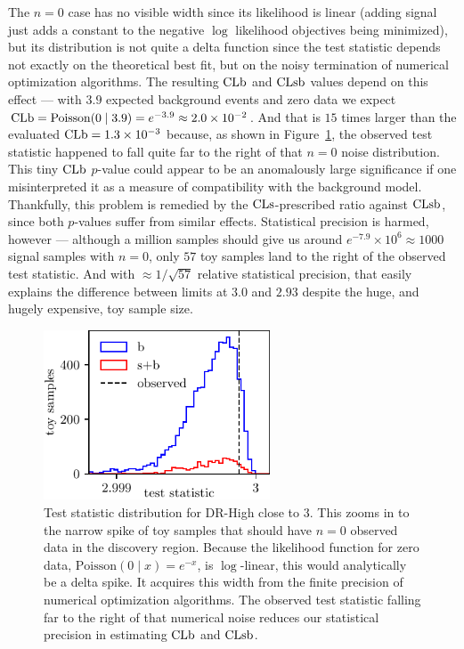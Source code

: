 The $n=0$ case has no visible width since its likelihood is linear
(adding signal just adds a constant to the negative $\log$ likelihood
objectives being minimized), but its distribution is not quite a delta function since the test
statistic depends not exactly on the theoretical best fit, but on the noisy
termination of numerical optimization algorithms.
The resulting $\mathrm{CLb}$ and $\mathrm{CLsb}$ values depend on this effect ---
with $3.9$ expected background events and zero data we expect
$\mathrm{CLb} = \mathrm{Poisson}(0\mid 3.9) = e^{-3.9} \approx 2.0\times 10^{-2}$.
And that is $15$ times larger than the evaluated $\mathrm{CLb} = 1.3\times 10^{-3}$
because, as shown in Figure~\ref{fig:2ljets_test_stat_distributions_drhigh_n0},
the observed test statistic happened to fall quite far to the right
of that $n=0$ noise distribution.
This tiny $\mathrm{CLb}$ $p$-value could appear to be an anomalously large
significance if one misinterpreted it as a measure of compatibility with the
background model.
Thankfully, this problem is remedied by the $\mathrm{CLs}$-prescribed ratio
against $\mathrm{CLsb}$, since both $p$-values suffer from similar effects.
Statistical precision is harmed, however --- although a million samples should
give us around $e^{-7.9} \times 10^6 \approx 1000$ signal samples with
$n=0$, only $57$ toy samples land to the right of the observed test statistic.
And with $\approx1/\sqrt{57}$ relative statistical precision, that easily
explains the difference between limits at $3.0$ and $2.93$ despite the huge,
and hugely expensive, toy sample size.

\begin{figure}[tp]
\centering
\includegraphics[width=0.6\textwidth]{figures/2ljets_drhigh_plot_n0.pdf}
\caption[
Test statistic distribution for DR-High close to $3$
]{%
Test statistic distribution for DR-High close to $3$.
This zooms in to the narrow spike of toy samples that should have $n=0$
observed data in the discovery region.
Because the likelihood function for zero data,
$\mathrm{Poisson}(0\mid x) = e^{-x}$, is $\log$-linear,
this would analytically be a delta spike.
It acquires this width from the finite precision of numerical optimization
algorithms.
The observed test statistic falling far to the right of that numerical noise
reduces our statistical precision in estimating $\mathrm{CLb}$ and $\mathrm{CLsb}$.
}
\label{fig:2ljets_test_stat_distributions_drhigh_n0}
\end{figure}

